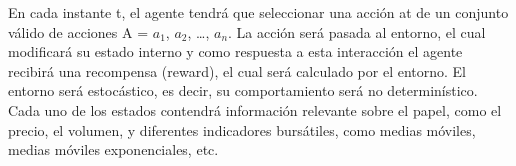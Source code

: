 En cada instante t, el agente tendrá que seleccionar una acción at  de un conjunto válido de acciones A = {$a_1$, $a_2$, …, $a_n$}. La acción será pasada al entorno, el cual modificará su estado interno y como respuesta a esta interacción el agente recibirá una recompensa (reward), el cual será calculado por el entorno. El entorno será estocástico, es decir, su comportamiento será no determinístico. Cada uno de los estados contendrá información relevante sobre el papel, como el precio, el volumen, y diferentes indicadores bursátiles, como medias móviles, medias móviles exponenciales, etc.

